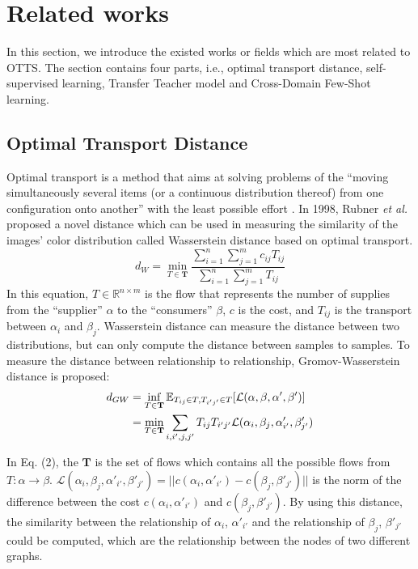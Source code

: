 \documentclass[10pt,journal,compsoc]{IEEEtran}
\begin{document}
\section{Related works}

In this section, we introduce the existed works or fields which are most related to OTTS. The section contains four parts, i.e., optimal transport distance, self-supervised learning, Transfer Teacher model and Cross-Domain Few-Shot learning.

\subsection{Optimal Transport Distance}

Optimal transport \cite{ot,ot_graph,GOT_DA} is a method that aims at solving problems of the “moving simultaneously several items (or a continuous distribution thereof) from one configuration onto another” with the least possible effort \cite{ot}. In 1998, Rubner \emph{et al.} \cite{WD} proposed a novel distance which can be used in measuring the similarity of the images’ color distribution called Wasserstein distance based on optimal transport. 
\begin{equation}
    d_W = \min_{T\in\mathbf{T}}\frac{\sum_{i=1}^n\sum_{j=1}^m c_{ij}T_{ij}}{\sum_{i=1}^n\sum_{j=1}^m T_{ij}}
\end{equation}
In this equation, $T \in \mathbb{R}^{n\times m}$ is the flow that represents the number of supplies from the “supplier” $\alpha$ to the “consumers” $\beta$, $c$ is the cost, and $T_{ij}$ is the transport between $\alpha_i$ and $\beta_j$. Wasserstein distance can measure the distance between two distributions, but can only compute the distance between samples to samples. To measure the distance between relationship to relationship, Gromov-Wasserstein distance \cite{GWD} is proposed:
\begin{align}
    d_{GW} &= \inf_{T\in\mathbf{T}} \mathbb{E}_{T_{ij} \in T,T_{i'j'} \in T}[\mathcal{L}(\alpha,\beta,\alpha',\beta')] \notag\\
    &=\min_{T\in\mathbf{T}} \sum_{i,i',j,j'} T_{ij}T_{i'j'}\mathcal{L}(\alpha_i,\beta_j,\alpha'_{i'},\beta'_{j'})
\end{align}

In Eq. (2), the $\mathbf{T}$ is the set of flows which contains all the possible flows from $T:\alpha \to \beta$. $\mathcal{L}(\alpha_i,\beta_j,\alpha'_{i'},\beta'_{j'})=||c(\alpha_i,\alpha'_{i'})-c(\beta_j,\beta'_{j'})||$ is the norm of the difference between the cost $c(\alpha_i,\alpha'_{i'})$ and $c(\beta_j,\beta'_{j'})$. By using this distance, the similarity between the relationship of $\alpha_i$, $\alpha'_{i'}$ and the relationship of $\beta_j$, $\beta'_{j'}$ could be computed, which are the relationship between the nodes of two different graphs.
\end{document}
